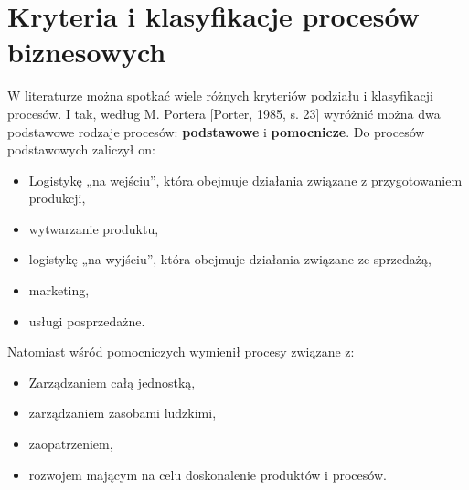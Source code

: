 \documentclass[a4paper, 12pt]{article}
\begin{document}
\section{Kryteria i klasyfikacje procesów biznesowych}
\hspace*{1.5 cm}W literaturze  można  spotkać  wiele  różnych  kryteriów  podziału  i klasyfikacji  procesów.  I  tak,  według  M.  Portera  [Porter,  1985,  s.  23]  wyróżnić  można  dwa  podstawowe  rodzaje  procesów:  \textbf{podstawowe}  i  \textbf{pomocnicze}. Do procesów podstawowych zaliczył on: 
\begin{itemize}
	\item Logistykę „na wejściu”, która obejmuje działania związane z przygotowaniem produkcji,
	\item wytwarzanie produktu, 
 	\item logistykę  „na  wyjściu”,  która obejmuje  działania związane ze sprzedażą,
	\item marketing,
	\item usługi posprzedażne.
\end{itemize}

\hspace*{1.5 cm}Natomiast wśród pomocniczych wymienił procesy związane z: 
\begin{itemize}
	\item Zarządzaniem całą jednostką,
	\item zarządzaniem zasobami ludzkimi,
	\item zaopatrzeniem,
	\item rozwojem mającym na celu doskonalenie produktów i procesów.
\end{itemize}
\end{document}
